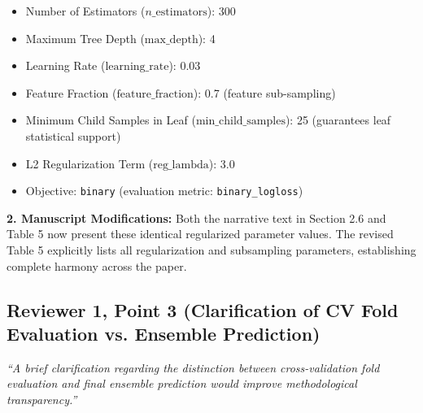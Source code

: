 \documentclass[11pt,a4paper]{article}
\newcommand{\reviewer}[1]{{\color{reviewgray}\textit{#1}}}
\newenvironment{authorresponse}{\par\begingroup\color{authorblue}}{\endgroup\par}
\begin{document}
\begin{authorresponse}
\begin{itemize}[leftmargin=2em]
  \begin{itemize}
    \item Number of Estimators ($n\_\mathrm{estimators}$): 300
    \item Maximum Tree Depth ($\mathrm{max\_depth}$): 4
    \item Learning Rate ($\mathrm{learning\_rate}$): 0.03
    \item Feature Fraction ($\mathrm{feature\_fraction}$): 0.7 (feature sub-sampling)
    \item Minimum Child Samples in Leaf ($\mathrm{min\_child\_samples}$): 25 (guarantees leaf statistical support)
    \item L2 Regularization Term ($\mathrm{reg\_lambda}$): 3.0
    \item Objective: \texttt{binary} (evaluation metric: \texttt{binary\_logloss})
  \end{itemize}
\end{itemize}

\textbf{2. Manuscript Modifications:}
Both the narrative text in Section 2.6 and Table 5 now present these identical regularized parameter values. The revised Table 5 explicitly lists all regularization and subsampling parameters, establishing complete harmony across the paper.
\end{authorresponse}

\vspace{1.5em}

\subsection*{Reviewer 1, Point 3 (Clarification of CV Fold Evaluation vs. Ensemble Prediction)}

\reviewer{“A brief clarification regarding the distinction between cross-validation fold evaluation and final ensemble prediction would improve methodological transparency.”}
\end{document}
